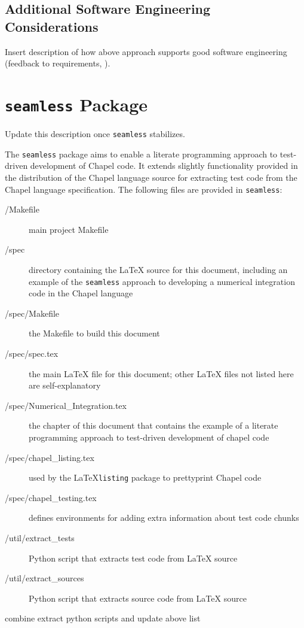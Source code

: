 \subsection{Additional Software Engineering Considerations}

\begin{TODO}
Insert description of how above approach supports good software engineering (feedback to requirements, \etc).
\end{TODO}

\section{\texttt{seamless} Package}
\begin{TODO}
Update this description once \lstinline{seamless} stabilizes.
\end{TODO}

The \lstinline{seamless} package aims to enable a literate programming approach to test-driven
development of Chapel code. It extends slightly functionality provided in the distribution
of the Chapel language source for extracting test code from the Chapel language specification.
The following files are provided in \lstinline{seamless}:
\begin{description}
\item[/Makefile] main project Makefile
\item[/spec] directory containing the \LaTeX\xspace source for this document, including an 
example of the \lstinline{seamless} approach to developing a numerical integration code in the Chapel language
\item[/spec/Makefile] the Makefile to build this document
\item[/spec/spec.tex] the main \LaTeX\xspace file for this document; other \LaTeX\xspace files not 
listed here are self-explanatory
\item[/spec/Numerical\_Integration.tex] the chapter of this document that contains the example of a literate
programming approach to test-driven development of chapel code
\item[/spec/chapel\_listing.tex] used by the \LaTeX\xspace \lstinline{listing} package to prettyprint Chapel code
\item[/spec/chapel\_testing.tex] defines environments for adding extra information about
test code chunks 
\item[/util/extract\_tests] Python script that extracts test code from \LaTeX\xspace source
\item[/util/extract\_sources] Python script that extracts source code from \LaTeX\xspace source 
\end{description}
\begin{TODO}
combine extract python scripts and update above list
\end{TODO}

